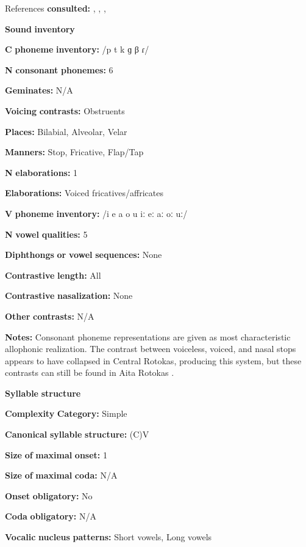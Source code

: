 References \textbf{consulted:} \citet{FirchowFirchow1969}, \citet{FirchowEtAl1973}, \citet{Robinson2006}, \citet{Robinson2011} 

\textbf{Sound} \textbf{inventory}

\textbf{C} \textbf{phoneme} \textbf{inventory:} /p t k ɡ β ɾ/

\textbf{N} \textbf{consonant} \textbf{phonemes:} 6

\textbf{Geminates:} N/A

\textbf{Voicing} \textbf{contrasts:} Obstruents

\textbf{Places:} Bilabial, Alveolar, Velar

\textbf{Manners:} Stop, Fricative, Flap/Tap

\textbf{N} \textbf{elaborations:} 1

\textbf{Elaborations:} Voiced fricatives/affricates

\textbf{V} \textbf{phoneme} \textbf{inventory:} /i e a o u iː eː aː oː uː/

\textbf{N} \textbf{vowel} \textbf{qualities:} 5

\textbf{Diphthongs} \textbf{or} \textbf{vowel} \textbf{sequences:} None

\textbf{Contrastive} \textbf{length:} All

\textbf{Contrastive} \textbf{nasalization:} None

\textbf{Other} \textbf{contrasts:} N/A

\textbf{Notes:} Consonant phoneme representations are given as most characteristic allophonic realization. The contrast between voiceless, voiced, and nasal stops appears to have collapsed in Central Rotokas, producing this system, but these contrasts can still be found in Aita Rotokas \citep{Robinson2006}.

\textbf{Syllable} \textbf{structure}

\textbf{Complexity} \textbf{Category:} Simple

\textbf{Canonical} \textbf{syllable} \textbf{structure:} (C)V \citep[28-9]{Robinson2011}

\textbf{Size} \textbf{of} \textbf{maximal} \textbf{onset:} 1

\textbf{Size} \textbf{of} \textbf{maximal} \textbf{coda:} N/A

\textbf{Onset} \textbf{obligatory:} No

\textbf{Coda} \textbf{obligatory:} N/A

\textbf{Vocalic} \textbf{nucleus} \textbf{patterns:} Short vowels, Long vowels

